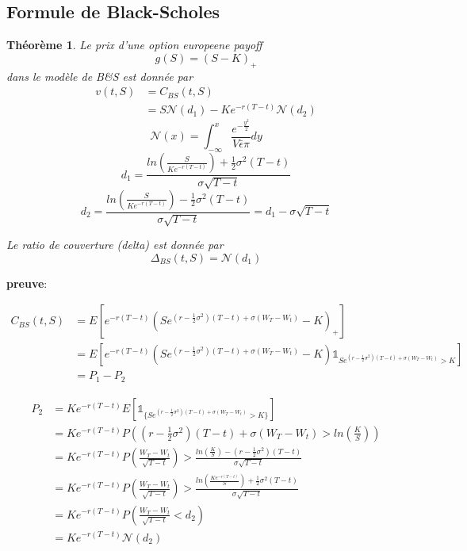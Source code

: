 \documentclass{article}
\theoremstyle{plain}
\newtheorem{thm}{Th\'eor\`eme}[section]
\theoremstyle{definition}
\begin{document}
\subsection{Formule de Black-Scholes}
\begin{thm}
	Le prix d'une option europeene payoff
\begin{equation}
g(S)=(S-K)_+
\end{equation}
dans le mod\`ele de B\&S est donn\'ee par
\begin{equation}
\begin{split}
v(t,S)&=C_{BS}(t,S)\\
&=S\mathcal{N}(d_1)-K e^{-r(T-t)}\mathcal{N}(d_2)
\end{split}
\end{equation}
\begin{equation}
\mathcal{N}(x)=\int_{-\infty}^x \frac{e^{-\frac{y^2}{2}}}{V\bar{\epsilon}\pi}dy
\end{equation}
\begin{equation}
d_1=\frac{ln(\frac{S}{Ke^{-r(T-t)}})+\frac{1}{2}\sigma^2(T-t)}{\sigma \sqrt{T-t}}
\end{equation}
\begin{equation}
d_2=\frac{ln(\frac{S}{Ke^{-r(T-t)}})-\frac{1}{2}\sigma^2(T-t)}{\sigma\sqrt{T-t}}=d_1-\sigma\sqrt{T-t}
\end{equation}

Le ratio de couverture (delta) est donn\'ee par
\begin{equation}
\Delta_{BS}(t,S)=\mathcal{N}(d_1)
\end{equation}

\end{thm}
\textbf{preuve}:

\begin{equation}
\begin{split}
C_{BS}(t,S)&=E[e^{-r(T-t)}(Se^{(r-\frac{1}{2}\sigma^2)(T-t)+\sigma(W_T-W_t)}-K)_+]\\
&=E[e^{-r(T-t)}(Se^{(r-\frac{1}{2}\sigma^2)(T-t)+\sigma(W_T-W_t)}-K) \mathds{1}_{Se^{(r-\frac{1}{2}\sigma^2)(T-t)+\sigma(W_T-W_t)}>K}]\\
&=P_1-P_2
\end{split}
\end{equation}

\begin{equation}
\begin{split}
P_2&=Ke^{-r(T-t)}E[\mathds{1}_{\{Se^{(r-\frac{1}{2}\sigma^2)(T-t)+\sigma(W_T-W_t)}>K\}}]\\
&=Ke^{-r(T-t)}P((r-\frac{1}{2}\sigma^2)(T-t)+\sigma(W_T-W_t)>ln(\frac{K}{S}))\\
&=Ke^{-r(T-t)}P(\frac{W_T-W_t}{\sqrt{T-t}})>\frac{ln(\frac{K}{S})-(r-\frac{1}{2}\sigma^2)(T-t)}{\sigma\sqrt{T-t}}\\
&=Ke^{-r(T-t)}P(\frac{W_T-W_t}{\sqrt{T-t}})>\frac{ln(\frac{Ke^{-r(T-t)}}{S})+\frac{1}{2}\sigma^2(T-t)}{\sigma\sqrt{T-t}}\\
&=Ke^{-r(T-t)}P(\frac{W_T-W_t}{\sqrt{T-t}}<d_2)\\
&=Ke^{-r(T-t)}\mathcal{N}(d_2)
\end{split}
\end{equation}
\end{document}
